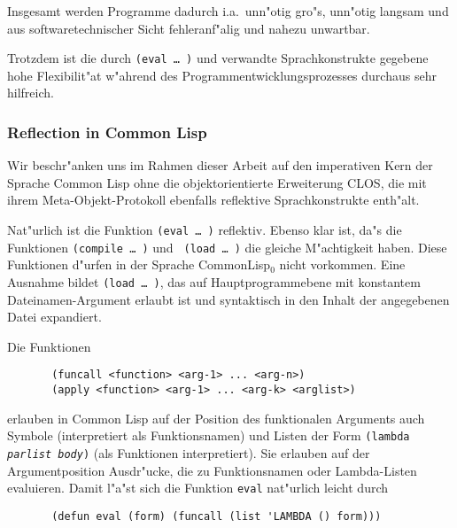 Insgesamt werden Programme dadurch i.a.\ unn"otig gro"s, unn"otig
langsam und aus softwaretechnischer Sicht fehleranf"alig und nahezu
unwartbar. 

Trotzdem ist die durch {\tt (eval\,\ldots\,)} und verwandte
Sprachkonstrukte gegebene hohe Flexi\-bi\-li\-t"at w"ahrend des
Programmentwicklungsprozesses durchaus sehr hilfreich.


\subsubsection*{Reflection in Common Lisp}

Wir beschr"anken uns im Rahmen dieser Arbeit auf den imperativen Kern
der Sprache Common Lisp ohne die objektorientierte Erweiterung CLOS,
die mit ihrem Meta-Objekt-Protokoll ebenfalls reflektive
Sprachkonstrukte enth"alt.

Nat"urlich ist die Funktion {\tt (eval\,\ldots\,)} reflektiv. Ebenso
klar ist, da"s die Funktionen {\tt (compile\,\ldots\,)} und {\tt
(load\,\ldots\,)}  die gleiche M"achtigkeit haben. Diese Funktionen
d"urfen in der Sprache CommonLisp$_0$ nicht vorkommen. Eine Ausnahme
bildet {\tt (load\,\ldots\,)}, das auf Hauptprogrammebene mit
konstantem Dateinamen-Argument erlaubt ist und syntaktisch in den
Inhalt der angegebenen Datei expandiert.

Die Funktionen

\begin{verbatim}
       (funcall <function> <arg-1> ... <arg-n>)
       (apply <function> <arg-1> ... <arg-k> <arglist>)
\end{verbatim}

erlauben in Common Lisp auf der Position des funktionalen Arguments
auch Symbole (interpretiert als Funktionsnamen) und Listen der Form
{\tt (lambda {\it parlist} {\it body})} (als Funktionen interpretiert).
Sie erlauben auf der Argumentposition Ausdr"ucke, die zu
Funktionsnamen oder Lambda-Listen evaluieren. Damit l"a"st sich die
Funktion {\tt eval} nat"urlich leicht durch

\begin{verbatim}
       (defun eval (form) (funcall (list 'LAMBDA () form)))
\end{verbatim}

